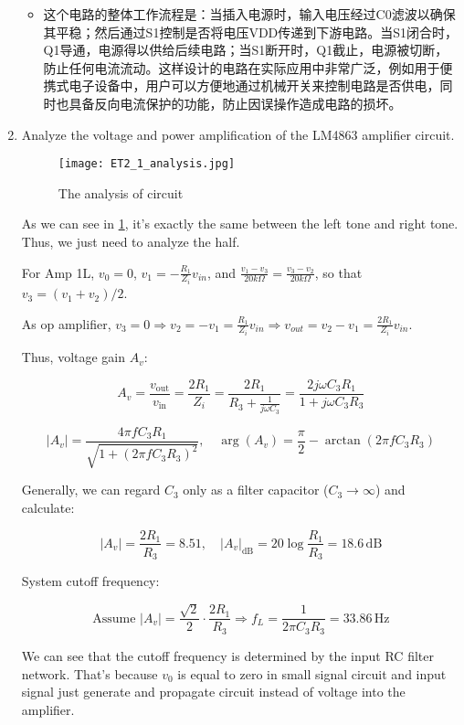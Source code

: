 \begin{enumerate}
\begin{itemize}
		\item 这个电路的整体工作流程是：当插入电源时，输入电压经过C0滤波以确保其平稳；然后通过S1控制是否将电压VDD传递到下游电路。当S1闭合时，Q1导通，电源得以供给后续电路；当S1断开时，Q1截止，电源被切断，防止任何电流流动。这样设计的电路在实际应用中非常广泛，例如用于便携式电子设备中，用户可以方便地通过机械开关来控制电路是否供电，同时也具备反向电流保护的功能，防止因误操作造成电路的损坏。
	\end{itemize}
	
	\item Analyze the voltage and power amplification of the LM4863 amplifier circuit.
	
	\begin{figure}[htbp]
		\centering
		\texttt{[image: ET2\_1\_analysis.jpg]}
		\caption{The analysis of circuit}
		\label{fig:analysis}
	\end{figure}
	
	As we can see in \cref{fig:analysis}, it's exactly the same between the left tone and right tone. Thus, we just need to analyze the half.
	
	For Amp 1L, $v_0=0$, $v_1=-\frac{R_1}{Z_i}v_{in}$, and $\frac{v_1-v_3}{20k\Omega}=\frac{v_3-v_2}{20k\Omega}$, so that $v_3 = (v_1 + v_2) / 2$.
	
	As op amplifier, $v_3=0\Rightarrow v_2=-v_1=\frac{R_1}{Z_i}v_{in}\Rightarrow v_{out} = v_2 - v_1 = \frac{2R_1}{Z_i}v_{in}$.
	
	Thus, voltage gain $A_v$:
	
	\[
	A_v = \frac{v_{\text{out}}}{v_{\text{in}}} = \frac{2R_1}{Z_i} = \frac{2R_1}{R_3 + \frac{1}{j\omega C_3}} = \frac{2j\omega C_3 R_1}{1 + j\omega C_3 R_3}
	\]
	
	\[
	|A_v| = \frac{4 \pi f C_3 R_1}{\sqrt{1 + (2 \pi f C_3 R_3)^2}}, \quad \arg(A_v) = \frac{\pi}{2} - \arctan(2 \pi f C_3 R_3)
	\]
	
	Generally, we can regard $C_3$ only as a filter capacitor ($C_3 \to \infty$) and calculate:
	
	\[
	|A_v| = \frac{2R_1}{R_3} = 8.51, \quad |A_v|_{\text{dB}} = 20 \log \frac{R_1}{R_3} = 18.6 \, \text{dB}
	\]
	
	System cutoff frequency:
	
	\[
	\text{Assume } |A_v| = \frac{\sqrt{2}}{2} \cdot \frac{2R_1}{R_3} \Rightarrow f_L = \frac{1}{2 \pi C_3 R_3} = 33.86 \, \text{Hz}
	\]
	
	We can see that the cutoff frequency is determined by the input RC filter network. That's because $v_0$ is equal to zero in small signal circuit and input signal just generate and propagate circuit instead of voltage into the amplifier.
	

\end{enumerate}
